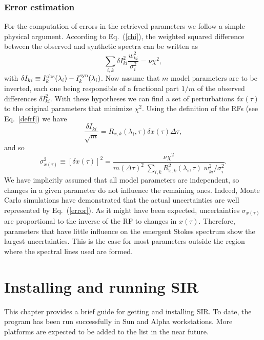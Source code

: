\subsection{Error estimation}
For the computation of errors in the retrieved parameters we 
follow a simple physical argument. According to Eq.\ (\ref{chi}), the weighted 
squared difference between the observed and synthetic spectra 
can be written as 
\begin{equation}
\sum_{i,k} \delta I^2_{ki} \frac{w^2_{ki}}{\sigma_i^2} = \nu \chi^2,
\end{equation}
with $\delta I_{ki} \equiv I^{\rm obs}_k(\lambda_i) - 
I^{\rm syn}_k(\lambda_i)$. Now assume that $m$ model parameters 
are to be inverted, each one being responsible of a fractional part 
$1/m$ of the observed differences $\delta I^2_{ki}$. With these hypotheses 
we can find a set of perturbations $\delta x(\tau)$ to the original parameters 
that minimize $\chi^2$. Using the definition of the RFs (see Eq.\ \ref{defrf}) 
we have 
\begin{equation}
\frac{\delta I_{ki}}{\sqrt{m}}  = R_{x,k}(\lambda_i,\tau) \delta x(\tau) 
\Delta \tau,
\end{equation}
and so
\begin{equation}
\label{error}
\sigma^2_{x(\tau)} \equiv [\delta x(\tau)]^2 = \frac{\nu \chi^2}{m (\Delta \tau)^2 \;
\sum_{i,k} R^2_{x,k}(\lambda_i,\tau) \; w^2_{ki}/\sigma^2_i}.
\end{equation}
We have implicitly assumed that all model parameters are independent, so
changes in a given parameter do not influence the remaining ones. Indeed, 
Monte Carlo simulations have demonstrated that the actual uncertainties 
are well represented by Eq.\ (\ref{error}).  As it might have been 
expected, uncertainties $\sigma_{x(\tau)}$ are proportional to the inverse 
of the RF to changes in $x(\tau)$. Therefore, parameters that have little 
influence on the emergent Stokes spectrum show the largest uncertainties. 
This is the case for most parameters outside the region where the 
spectral lines used are formed.


\chapter{Installing and running SIR}
This chapter provides a brief guide for getting and installing SIR. To
date, the program has been run successfully in Sun and Alpha
workstations. More platforms are expected to be added to the list in
the near future. 

